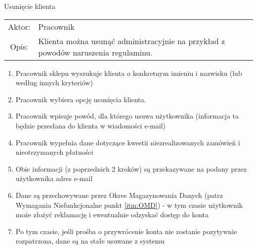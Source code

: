 \item Usunięcie klienta \\
  \begin{tabularx}{\linewidth}{ c X }
  Aktor: & Pracownik \\
  Opis: & Klienta można usunąć administracyjnie na przykład z powodów
  naruszenia regulaminu.\\
  \end{tabularx}
  \begin{enumerate}
    \item Pracownik sklepu wyszukuje klienta o konkretnym imieniu i nazwisku
    (lub według innych kryteriów)
    \item Pracownik wybiera opcję usunięcia klienta. 
    \item Pracownik wpisuje powód, dla którego usuwa użytkownika (informacja ta
    będzie przesłana do klienta w wiadomości e-mail)
    \item Pracownik wypełnia dane dotyczące kwestii niezrealizowanych zamówień i
    nieotrzymanych płatności
    \item Obie informacji (z poprzednich 2 kroków) są przekazywane na podany
    przez użytkownika adres e-mail
    \item Dane są przechowywane przez Okres Magazynowania Danych (patrz
    Wymagania Niefunkcjonalne punkt \ref{itm:OMD}) - w tym czasie użytkownik
    może złożyć reklamację i ewentualnie odzyskać dostęp do konta
    \item Po tym czasie, jeśli prośba o przywrócenie konta nie zostanie
    pozytywnie rozpatrzona, dane są na stałe usuwane z systemu
  \end{enumerate}